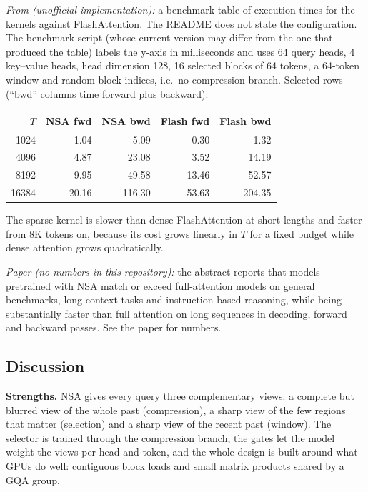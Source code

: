 \begin{results}
\emph{From  (unofficial
implementation):} a benchmark table of execution times for the \fla{} kernels against
FlashAttention. The README does not state the configuration. The benchmark script
 (whose current
version may differ from the one that produced the table) labels the y-axis in milliseconds and
uses 64 query heads, 4 key--value heads, head dimension 128, 16 selected blocks of 64 tokens, a
64-token window and random block indices, i.e.\ no compression branch. Selected rows (``bwd''
columns time forward plus backward):
\begin{center}
\small
\begin{tabular}{rrrrr}
\toprule
$T$ & NSA fwd & NSA bwd & Flash fwd & Flash bwd\\
\midrule
1024 & 1.04 & 5.09 & 0.30 & 1.32\\
4096 & 4.87 & 23.08 & 3.52 & 14.19\\
8192 & 9.95 & 49.58 & 13.46 & 52.57\\
16384 & 20.16 & 116.30 & 53.63 & 204.35\\
\bottomrule
\end{tabular}
\end{center}
The sparse kernel is slower than dense FlashAttention at short lengths and faster from 8K tokens
on, because its cost grows linearly in $T$ for a fixed budget while dense attention grows
quadratically.

\emph{Paper (no numbers in this repository):} the abstract reports that models pretrained with NSA
match or exceed full-attention models on general benchmarks, long-context tasks and
instruction-based reasoning, while being substantially faster than full attention on long
sequences in decoding, forward and backward passes. See the paper for numbers.
\end{results}

\subsection{Discussion}

\textbf{Strengths.} NSA gives every query three complementary views: a complete but blurred view
of the whole past (compression), a sharp view of the few regions that matter (selection) and a
sharp view of the recent past (window). The selector is trained through the compression branch,
the gates let the model weight the views per head and token, and the whole design is built
around what GPUs do well: contiguous block loads and small matrix products shared by a GQA group.

